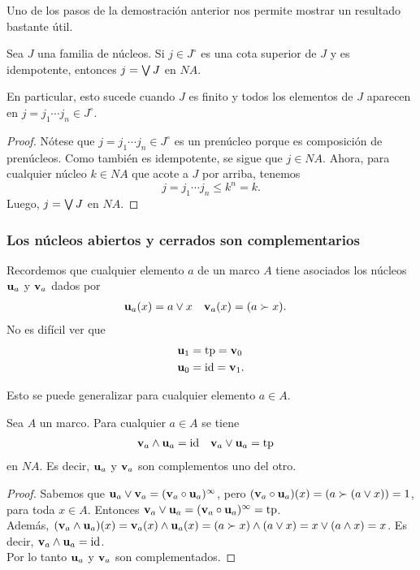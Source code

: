 Uno de los pasos de la demostración anterior
nos permite mostrar un resultado bastante útil.
\begin{cor}
    Sea $J$ una familia de núcleos.
    Si $j\in J^\circ$ es una cota superior de $J$
    y es idempotente, entonces $j=\bigvee J$ en $NA$.
    
    En particular, esto sucede cuando $J$ es finito y todos los
    elementos de $J$ aparecen en $j=j_1\cdots j_n\in J^\circ$.
\end{cor}
\begin{proof}
    Nótese que $j=j_1\cdots j_n\in J^\circ$
    es un prenúcleo porque es composición de prenúcleos.
    Como también es idempotente, se sigue que $j\in NA$.
    Ahora, para cualquier núcleo $k\in NA$ que acote a $J$ por arriba,
    tenemos
    \[
        j = j_1\cdots j_n \leq k^n = k
    .\]
    Luego, $j=\bigvee J$ en $NA$.
\end{proof}

\subsubsection{Los núcleos abiertos y cerrados son complementarios}

Recordemos que cualquier elemento $a$ de un marco $A$ tiene
asociados los núcleos $\mathbf u_{a}$ y $\mathbf v_{a}$ dados por
\begin{align*}
  \mathbf u_{a}(x) &= a\vee x
  &
  \mathbf v_{a}(x) &= (a\succ x).
\end{align*}
No es difícil ver que
\begin{align*}
  \mathbf u_{1} &= \mathrm{tp} = \mathbf v_{0} \\
  \mathbf u_{0} &= \mathrm{id} = \mathbf v_{1}.
\end{align*}

Esto se puede generalizar para cualquier elemento $a\in A$.

\begin{lemma}
  Sea $A$ un marco.
  Para cualquier $a\in A$ se tiene
  \begin{align*}
    \mathbf v_{a}\wedge\mathbf u_{a} &= \mathrm{id}
    &
    \mathbf v_{a}\vee\mathbf u_{a} &= \mathrm{tp}
  \end{align*}
  en $NA$.
  Es decir, $\mathbf u_{a}$ y $\mathbf v_{a}$ son complementos uno del otro.
\end{lemma}
\begin{proof}
Sabemos que $\mathbf u_{a}\vee \mathbf v_{a}=(\mathbf v_{a}\circ \mathbf u_{a})^\infty$, pero $(\mathbf v_{a}\circ \mathbf u_{a})(x)=(a\succ (a\vee x))=1$, para toda $x\in A$. Entonces $\mathbf v_{a}\vee \mathbf u_{a}=(\mathbf v_{a}\circ \mathbf u_{a})^\infty=\mathrm{tp}$.\\
Además, $(\mathbf v_{a}\wedge \mathbf u_{a})(x)=\mathbf v_{a}(x)\wedge \mathbf u_{a}(x)=(a\succ x)\wedge (a\vee x)=x\vee (a\wedge x)=x$. Es decir, $\mathbf v_{a}\wedge \mathbf u_{a}=\mathrm{id}$.\\
Por lo tanto $\mathbf u_{a}$ y $\mathbf v_{a}$ son complementados.
\end{proof}

